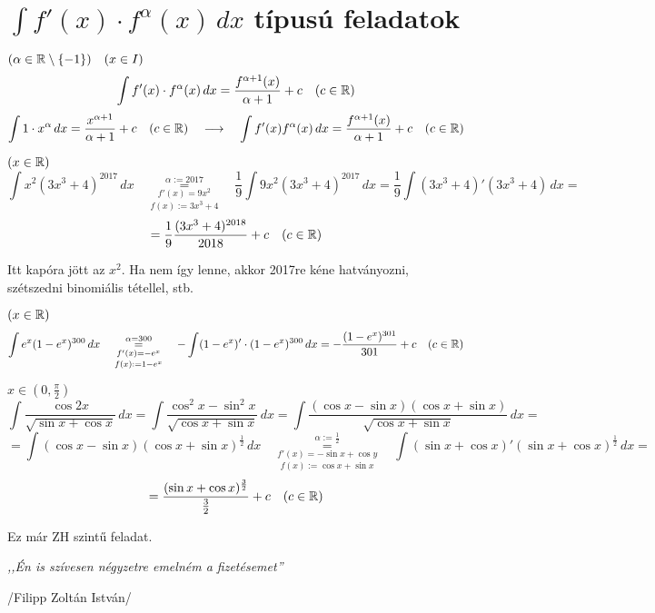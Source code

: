\documentclass[a4paper,11.5pt]{article}
\begin{document}
	\section{$\int f'(x)\cdot f^\alpha(x)\,dx$ típusú feladatok}
	\begin{task} $(\alpha\in\mathbb{R}\setminus\{-1\})\quad (x\in I)$
		\[ \int f'(x)\cdot f^\alpha(x)\,dx=\frac{f^{\alpha+1}(x)}{\alpha+1}+c\quad (c\in\mathbb{R}) \]
		\[ \int 1\cdot x^\alpha\,dx=\frac{x^{\alpha+1}}{\alpha+1}+c\quad (c\in\mathbb{R})\quad \longrightarrow\quad \int f'(x)f^\alpha(x)\,dx=\frac{f^{\alpha+1}(x)}{\alpha+1}+c \quad (c\in\mathbb{R}) \]
	\end{task}
	\begin{task}
		$(x\in\mathbb{R})$
		\[ \int x^2(3x^3+4)^{2017}\,dx\quad \overset{\alpha:=2017}{\underset{f(x):=3x^3+4}{\underset{f'(x)=9x^2}{=}}}\quad \frac{1}{9}\int 9x^2(3x^3+4)^{2017}\,dx=\frac{1}{9}\int(3x^3+4)'(3x^3+4)\,dx=\]
		\[=\frac{1}{9}\frac{(3x^3+4)^{2018}}{2018}+c\quad (c\in\mathbb{R}) \]
		\begin{note}
			Itt kapóra jött az  $x^2$. Ha nem így lenne, akkor 2017re kéne hatványozni, szétszedni binomiális tétellel, stb.
		\end{note}
	\end{task}
	\begin{task}$(x\in\mathbb{R})$
		\[\int e^x (1-e^x)^{300}\,dx\quad \overset{\alpha=300}{\underset{f(x):=1-e^x}{\underset{f'(x)=-e^x}{=}}}\quad -\int(1-e^x)'\cdot(1-e^x)^{300}\,dx=-\frac{(1-e^x)^{301}}{301}+c\quad (c\in\mathbb{R}) \]
	\end{task}
	\begin{task}
		$x\in\left(0,\frac{\pi}{2}\right)$
		\[ \int\frac{\cos2x}{\sqrt{\sin x+\cos x}}\,dx = \int \frac{\cos^2 x-\sin^2 x}{\sqrt{\cos x+\sin x}}\,dx=\int\frac{(\cos x-\sin x)(\cos x+\sin x)}{\sqrt{\cos x+\sin x}}\,dx=\]
		\[=\int(\cos x-\sin x)(\cos x+\sin x)^{\frac{1}{2}}\,dx\quad \overset{\alpha:=\frac{1}{2}}{\underset{f(x):=\cos x+\sin x}{\underset{f'(x)=-\sin x+\cos y}{=}}}\quad \int(\sin x+\cos x)'(\sin x+\cos x)^{\frac{1}{2}}\,dx=\]
		\[=\frac{(\sin x + \cos x)^{\frac{3}{2}}}{\frac{3}{2}}+c\quad (c\in\mathbb{R}) \]
		\begin{note}
			Ez már ZH szintű feladat.
		\end{note}
	\end{task}
	\bigskip
	
	\begin{center}
		\textit{,,Én is szívesen négyzetre emelném a fizetésemet''}
		\smallskip
		
		/Filipp Zoltán István/
	\end{center}
	\bigskip
\end{document}
